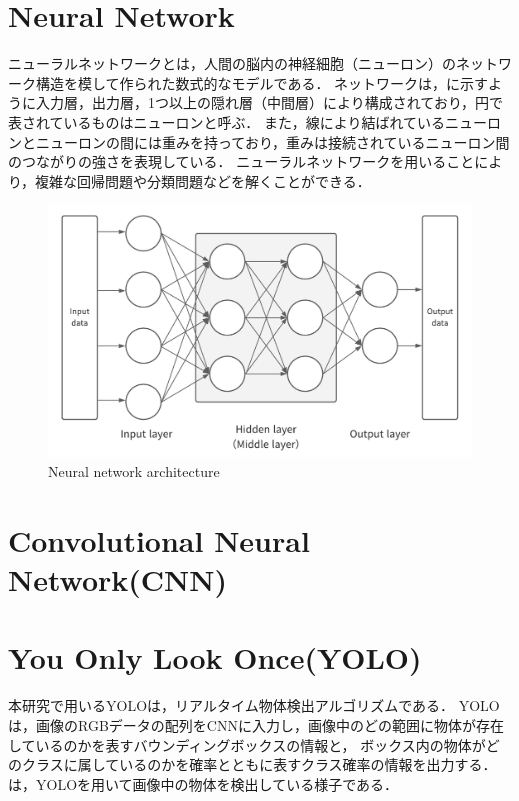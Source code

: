 \documentclass[../main]{subfiles}
\begin{document}
          \newpage
          
        \section{Neural Network}
        ニューラルネットワークとは，人間の脳内の神経細胞（ニューロン）のネットワーク構造を模して作られた数式的なモデルである．
        ネットワークは，に示すように入力層，出力層，1つ以上の隠れ層（中間層）により構成されており，円で表されているものはニューロンと呼ぶ．
        また，線により結ばれているニューロンとニューロンの間には重みを持っており，重みは接続されているニューロン間のつながりの強さを表現している．
        ニューラルネットワークを用いることにより，複雑な回帰問題や分類問題などを解くことができる．
        \begin{figure}[H]
         \centering
         \includegraphics[width=12cm]{../images/NN.png}
         \caption{Neural network architecture}
         \label{figure::NN}
        \end{figure}

        \newpage
        
        \section{Convolutional Neural Network(CNN)}

        \newpage

        \section{You Only Look Once(YOLO)}
        本研究で用いるYOLO\cite{yolo_paper_v1}\cite{yolo_paper_v2}\cite{yolo_paper_v3}\cite{yolo_paper_v4}は，リアルタイム物体検出アルゴリズムである．
        YOLOは，画像のRGBデータの配列をCNNに入力し，画像中のどの範囲に物体が存在しているのかを表すバウンディングボックスの情報と，
        ボックス内の物体がどのクラスに属しているのかを確率とともに表すクラス確率の情報を出力する．
        は，YOLOを用いて画像中の物体を検出している様子である． 
\end{document}
